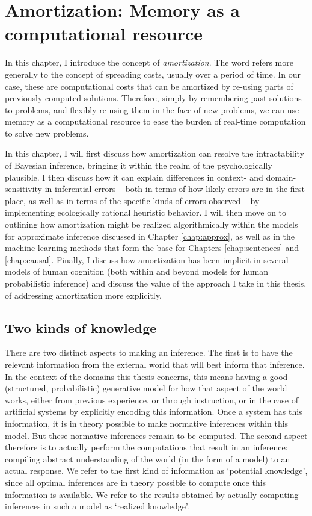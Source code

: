 \chapter{Amortization: Memory as a computational resource}
\label{chap:amort}


In this chapter, I introduce the concept of \textit{amortization}. The word refers more generally to the concept of spreading costs, usually over a period of time. In our case, these are computational costs that can be amortized by re-using parts of previously computed solutions. Therefore, simply by remembering past solutions to problems, and flexibly re-using them in the face of new problems, we can use memory as a computational resource to ease the burden of real-time computation to solve new problems. 

In this chapter, I will first discuss how amortization can resolve the intractability of Bayesian inference, bringing it within the realm of the psychologically plausible. I then discuss how it can explain differences in context- and domain-sensitivity in inferential errors -- both in terms of how likely errors are in the first place, as well as in terms of the specific kinds of errors observed -- by implementing ecologically rational heuristic behavior. I will then move on to outlining how amortization might be realized algorithmically within the models for approximate inference discussed in Chapter \ref{chap:approx}, as well as in the machine learning methods that form the base for Chapters \ref{chap:sentences} and \ref{chap:causal}. Finally, I discuss how amortization has been implicit in several models of human cognition (both within and beyond models for human probabilistic inference) and discuss the value of the approach I take in this thesis, of addressing amortization more explicitly.

\section{Two kinds of knowledge}

There are two distinct aspects to making an inference. The first is to have the relevant information from the external world that will best inform that inference. In the context of the domains this thesis concerns, this means having a good (structured, probabilistic) generative model for how that aspect of the world works, either from previous experience, or through instruction, or in the case of artificial systems by explicitly encoding this information. Once a system has this information, it is in theory possible to make normative inferences within this model. But these normative inferences remain to be computed. The second aspect therefore is to actually perform the computations that result in an inference: compiling abstract understanding of the world (in the form of a model) to an actual response. We refer to the first kind of information as `potential knowledge', since all optimal inferences are in theory possible to compute once this information is available. We refer to the results obtained by actually computing inferences in such a model as `realized knowledge'. 

